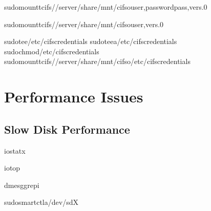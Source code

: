 \documentclass[letterpaper,10pt,english]{sphinxmanual}
\begin{document}
\begin{sphinxVerbatim}[commandchars=\\\{\}]
sudomount\PYGZhy{}tcifs//server/share/mnt/cifs\PYGZhy{}ouser,passwordpass,vers.0

sudomount\PYGZhy{}tcifs//server/share/mnt/cifs\PYGZhy{}ouser,vers.0

sudotee/etc/cifs\PYGZhy{}credentials
sudotee\PYGZhy{}a/etc/cifs\PYGZhy{}credentials
sudochmod/etc/cifs\PYGZhy{}credentials
sudomount\PYGZhy{}tcifs//server/share/mnt/cifs\PYGZhy{}o/etc/cifs\PYGZhy{}credentials
\end{sphinxVerbatim}


\section{Performance Issues}
\label{\detokenize{troubleshooting:performance-issues}}

\subsection{Slow Disk Performance}
\label{\detokenize{troubleshooting:slow-disk-performance}}
\sphinxAtStartPar
{}

\begin{sphinxVerbatim}[commandchars=\\\{\}]
iostat\PYGZhy{}x

iotop

dmesggrep\PYGZhy{}i

sudosmartctl\PYGZhy{}a/dev/sdX
\end{sphinxVerbatim}
\end{document}
